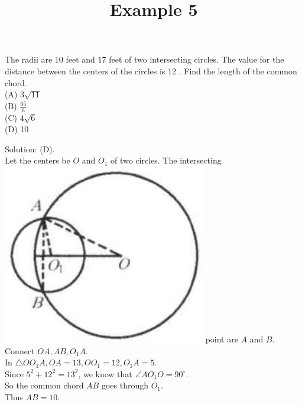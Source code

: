 \documentclass{article}
\title{Example 5}
\date{}
\begin{document}
\maketitle

The radii are 10 feet and 17 feet of two intersecting circles. The value for the distance between the centers of the circles is 12 . Find the length of the common chord.\\
(A) \(3 \sqrt{11}\)\\
(B) \(\frac{65}{6}\)\\
(C) \(4 \sqrt{6}\)\\
(D) 10

Solution: (D).\\
Let the centers be \(O\) and \(O_{1}\) of two circles. The intersecting\\
\includegraphics[width=\textwidth]{images/178.jpg} point are \(A\) and \(B\). Connect \(O A, A B, O_{1} A\).\\
In \(\triangle O O_{1} A, O A=13, O O_{1}=12, O_{1} A=5\).\\
Since \(5^{2}+12^{2}=13^{2}\), we know that \(\angle A O_{1} O=90^{\circ}\).\\
So the common chord \(A B\) goes through \(O_{1}\).\\
Thus \(A B=10\).
\end{document}
